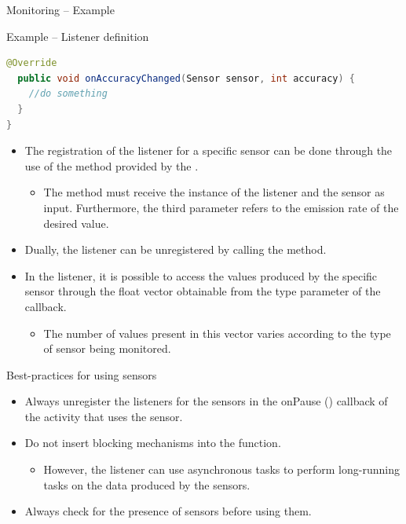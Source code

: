 \documentclass{beamer}
\begin{document}
\begin{frame}{Monitoring -- Example}
\begin{exampleblock}{Example -- Listener definition}
\begin{lstlisting}[language=Java]
  @Override
  public void onAccuracyChanged(Sensor sensor, int accuracy) {
    //do something		
  }
}
      \end{lstlisting}
    \end{exampleblock}
    \begin{itemize}\itemsep10pt
      \item The registration of the listener for a specific sensor can be done
      through the use of the  method provided by the
      .
      \begin{itemize}
        \item The method must receive the instance of the listener and the
        sensor as input. Furthermore, the third parameter refers to the emission
        rate of the desired value.
      \end{itemize}
      \item Dually, the listener can be unregistered by calling the
       method.
      \item In the listener, it is possible to access the values produced by the
      specific sensor through the float vector obtainable from the 
      type parameter of the  callback.
      \begin{itemize}
        \item The number of values present in this vector varies according to
        the type of sensor being monitored.
      \end{itemize}
    \end{itemize}

  \end{frame}

  \begin{frame}{Best-practices for using sensors}
    \begin{itemize}\itemsep20pt
      \item Always unregister the listeners for the sensors in the onPause ()
      callback of the activity that uses the sensor.
      \item Do not insert blocking mechanisms into the 
      function.
      \begin{itemize}
        \item However, the listener can use asynchronous tasks to perform
        long-running tasks on the data produced by the sensors.
      \end{itemize}
      \item Always check for the presence of sensors before using them.
    \end{itemize}
  \end{frame}
\end{document}
